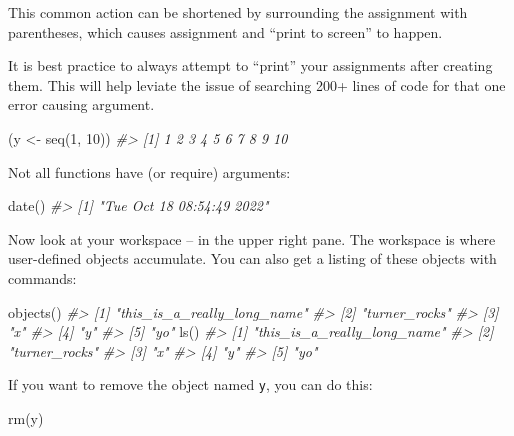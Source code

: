 \documentclass[
]{book}
\newenvironment{Shaded}{\begin{snugshade}}{\end{snugshade}}
\newcommand{\CommentTok}[1]{\textcolor[rgb]{0.56,0.35,0.01}{\textit{#1}}}
\newcommand{\DecValTok}[1]{\textcolor[rgb]{0.00,0.00,0.81}{#1}}
\newcommand{\FunctionTok}[1]{\textcolor[rgb]{0.00,0.00,0.00}{#1}}
\newcommand{\NormalTok}[1]{#1}
\newcommand{\OtherTok}[1]{\textcolor[rgb]{0.56,0.35,0.01}{#1}}
\begin{document}
This common action can be shortened by surrounding the assignment with parentheses, which causes assignment and ``print to screen'' to happen.

It is best practice to always attempt to ``print'' your assignments after creating them. This will help leviate the issue of searching 200+ lines of code for that one error causing argument.

\begin{Shaded}
\begin{Highlighting}[]
\NormalTok{(y }\OtherTok{\textless{}{-}} \FunctionTok{seq}\NormalTok{(}\DecValTok{1}\NormalTok{, }\DecValTok{10}\NormalTok{))}
\CommentTok{\#\textgreater{}  [1]  1  2  3  4  5  6  7  8  9 10}
\end{Highlighting}
\end{Shaded}

Not all functions have (or require) arguments:

\begin{Shaded}
\begin{Highlighting}[]
\FunctionTok{date}\NormalTok{()}
\CommentTok{\#\textgreater{} [1] "Tue Oct 18 08:54:49 2022"}
\end{Highlighting}
\end{Shaded}

Now look at your workspace -- in the upper right pane. The workspace is where user-defined objects accumulate. You can also get a listing of these objects with commands:

\begin{Shaded}
\begin{Highlighting}[]
\FunctionTok{objects}\NormalTok{()}
\CommentTok{\#\textgreater{} [1] "this\_is\_a\_really\_long\_name"}
\CommentTok{\#\textgreater{} [2] "turner\_rocks"              }
\CommentTok{\#\textgreater{} [3] "x"                         }
\CommentTok{\#\textgreater{} [4] "y"                         }
\CommentTok{\#\textgreater{} [5] "yo"}
\FunctionTok{ls}\NormalTok{()}
\CommentTok{\#\textgreater{} [1] "this\_is\_a\_really\_long\_name"}
\CommentTok{\#\textgreater{} [2] "turner\_rocks"              }
\CommentTok{\#\textgreater{} [3] "x"                         }
\CommentTok{\#\textgreater{} [4] "y"                         }
\CommentTok{\#\textgreater{} [5] "yo"}
\end{Highlighting}
\end{Shaded}

If you want to remove the object named \texttt{y}, you can do this:

\begin{Shaded}
\begin{Highlighting}[]
\FunctionTok{rm}\NormalTok{(y)}
\end{Highlighting}
\end{Shaded}
\end{document}
